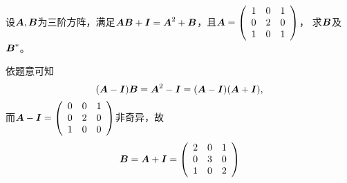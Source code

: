 \begin{frame}

\begin{li}[2008-2009第一学期]
设$\MA,\MB$为三阶方阵，满足$\MA\MB+\MI=\MA^2+\MB$，且$\MA=\left(
\begin{array}{rrr}
1&0&1\\
0&2&0\\
1&0&1
\end{array}
\right)$， 求$\MB$及$\MB^*$。
\end{li}
\pause

\begin{jie}
依题意可知
$$
(\MA-\MI)\MB=\MA^2-\MI=(\MA-\MI)(\MA+\MI),
$$
而$\MA-\MI=\left(
\begin{array}{rrr}
0&0&1\\
0&2&0\\
1&0&0
\end{array}
\right)$非奇异，故$$\MB=\MA+\MI=\left(
\begin{array}{rrr}
2&0&1\\
0&3&0\\
1&0&2
\end{array}
\right)$$
\end{jie}
\end{frame}







